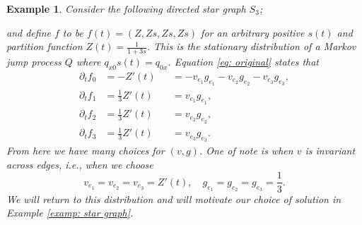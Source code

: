 \documentclass[conference]{IEEEtran}
\theoremstyle{ieeestyle}
\newtheorem{exam}{Example}
\begin{document}
\begin{exam}\label{exam: stargraph1}
    Consider the following directed star graph $S_3$;
    \begin{center}
\end{center}    
    and define $f$ to be $
        f(t) = (Z,Zs,Zs,Zs)$ for an arbitrary positive $s(t)$ and partition function $Z(t) = \frac{1}{1+3s}$. This is the stationary distribution of a Markov jump process $Q$ where $q_{x0}s(t) = q_{0x}$. Equation \eqref{eq: original} states that 
    \begin{align*}
        \partial_tf_0 & = -Z'(t) &&= -v_{e_1}g_{e_1} - v_{e_2}g_{e_2} - v_{e_3}g_{e_3},\\
        \partial_t f_1 &= \frac{1}{3}Z'(t) &&= v_{e_1}g_{e_1},\\
        \partial_t f_2 &= \frac{1}{3}Z'(t)  &&= v_{e_2}g_{e_2},\\
        \partial_t f_3 &= \frac{1}{3}Z'(t) &&= v_{e_3}g_{e_3}.
    \end{align*}
    \addtolength{\topskip}{2pt}
    From here we have many choices for $(v,g)$. One of note is when $v$ is invariant across edges, i.e., when we choose 
    \begin{equation*}
        v_{e_1} = v_{e_2} = v_{e_3} = Z'(t), \quad g_{e_1} = g_{e_2} = g_{e_3} = \frac{1}{3}.
    \end{equation*}
    We will return to this distribution and will motivate our choice of solution in Example \ref{examp: star graph}.
\end{exam}
\end{document}
